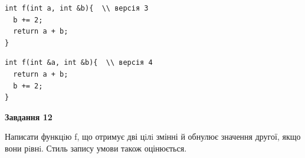\documentclass[12pt, ukrainian]{article}
\begin{document}
{\begin {large}
\begin{minipage}[t]{11.0cm}
\vspace{-8mm}\begin{verbatim}
int f(int a, int &b){  \\ версія 3
  b += 2;
  return a + b;
}
\end{verbatim}

\vspace{-8mm}\begin{verbatim}
int f(int &a, int &b){  \\ версія 4
  return a + b;
  b += 2;
}
\end{verbatim}



\begin{center}
\textbf{Завдання 12}
\end{center}

Написати функцiю f, що отримує дві цiлi змінні й обнулює значення другої, якщо вони рiвнi. Стиль запису умови також оцінюється.\par

\end{minipage}

\end {large}}
\newpage
\end{document}
